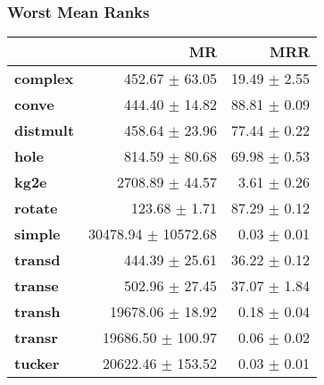 \documentclass{article}
\begin{document}
    \subsubsection{Worst Mean Ranks}
    \begin{center}
    \begin{tabular}{lrr}
\toprule
{} &                   MR &           MRR \\
\midrule
\textbf{complex } &       452.67 $\pm$ 63.05 &  19.49 $\pm$ 2.55 \\
\textbf{conve   } &       444.40 $\pm$ 14.82 &  88.81 $\pm$ 0.09 \\
\textbf{distmult} &       458.64 $\pm$ 23.96 &  77.44 $\pm$ 0.22 \\
\textbf{hole    } &       814.59 $\pm$ 80.68 &  69.98 $\pm$ 0.53 \\
\textbf{kg2e    } &      2708.89 $\pm$ 44.57 &   3.61 $\pm$ 0.26 \\
\textbf{rotate  } &        123.68 $\pm$ 1.71 &  87.29 $\pm$ 0.12 \\
\textbf{simple  } &  30478.94 $\pm$ 10572.68 &   0.03 $\pm$ 0.01 \\
\textbf{transd  } &       444.39 $\pm$ 25.61 &  36.22 $\pm$ 0.12 \\
\textbf{transe  } &       502.96 $\pm$ 27.45 &  37.07 $\pm$ 1.84 \\
\textbf{transh  } &     19678.06 $\pm$ 18.92 &   0.18 $\pm$ 0.04 \\
\textbf{transr  } &    19686.50 $\pm$ 100.97 &   0.06 $\pm$ 0.02 \\
\textbf{tucker  } &    20622.46 $\pm$ 153.52 &   0.03 $\pm$ 0.01 \\
\bottomrule
\end{tabular}

    \end{center}
\end{document}
